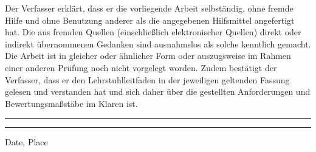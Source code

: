 Der Verfasser erklärt, dass er die vorliegende Arbeit selbständig, ohne fremde Hilfe und ohne Benutzung anderer als die angegebenen Hilfsmittel angefertigt hat. Die aus fremden Quellen (einschließlich elektronischer Quellen) direkt oder indirekt übernommenen Gedanken sind ausnahmslos als solche kenntlich gemacht. Die Arbeit ist in gleicher oder ähnlicher Form oder auszugsweise im Rahmen einer anderen Prüfung noch nicht vorgelegt worden. Zudem bestätigt der Verfasser, dass er den Lehrstuhlleitfaden in der jeweiligen geltenden Fassung gelesen und verstanden hat und sich daher über die gestellten Anforderungen und Bewertungsmaßstäbe im Klaren ist. \\[4cm]
\noindent\rule{5cm}{.4pt}\hfill\rule{7 cm}{.4pt}\par 
\noindent Date, Place \hfill \autor 
